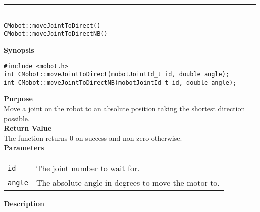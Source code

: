 \noindent
\vspace{5pt}
\rule{4.5in}{0.015in}\\
\noindent
{\LARGE \texttt{CMobot::moveJointToDirect()}}\\
{\LARGE \texttt{CMobot::moveJointToDirectNB()}}\\
{}

\noindent
{\bf Synopsis}
\vspace{-8pt}
\begin{verbatim}
#include <mobot.h>
int CMobot::moveJointToDirect(mobotJointId_t id, double angle);
int CMobot::moveJointToDirectNB(mobotJointId_t id, double angle);
\end{verbatim}

\noindent
{\bf Purpose}\\
Move a joint on the robot to an absolute position taking the shortest direction possible.\\

\noindent
{\bf Return Value}\\
The function returns 0 on success and non-zero otherwise.\\

\noindent
{\bf Parameters}\\
\vspace{-0.1in}
\begin{description}
\item               
\begin{tabular}{p{10 mm}p{145 mm}}
\texttt{id} & The joint number to wait for. \\
\texttt{angle} & The absolute angle in degrees to move the motor to.  \\
\end{tabular}
\end{description}

\noindent
{\bf Description}\\
\vspace{-12pt}

